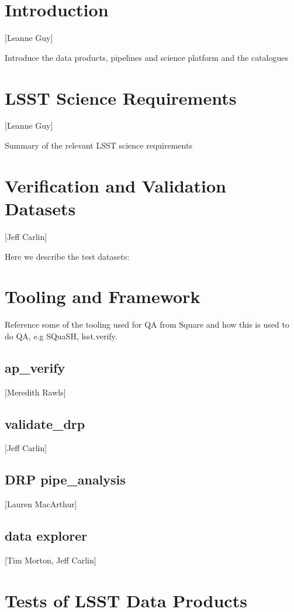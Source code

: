 
\section{Introduction}
[Leanne Guy]

Introduce the data products, pipelines and science platform and the catalogues

\section{LSST Science Requirements}
[Leanne Guy]
 
 Summary of the relevant LSST science requirements 
 
\section{Verification and Validation Datasets} 
[Jeff Carlin]

Here we describe the test datasets: \cite{DMTN-091}

\section{Tooling  and Framework} 

Reference some of the  tooling used  for QA  from Square \cite{pstm-023} and how this is used to do QA, e.g SQuaSH, lsst.verify. 

\subsection{ap\_verify} 
[Meredith Rawls]

\subsection{validate\_drp}
[Jeff Carlin]

\subsection{ DRP pipe\_analysis}
[Lauren MacArthur]

\subsection{data explorer}
[Tim Morton, Jeff Carlin]

\section{Tests of LSST Data Products } 

